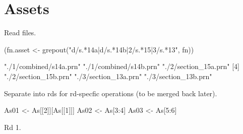 \section{Assets}


Read files.
\begin{Schunk}
\begin{Sinput}
(fn.asset <- grepout("d/s.*14a|d/s.*14b|2/s.*15|3/s.*13", fn))
\end{Sinput}
\begin{Soutput}
[1] "./1/combined/s14a.prn" "./1/combined/s14b.prn" "./2/section_15a.prn"  
[4] "./2/section_15b.prn"   "./3/section_13a.prn"   "./3/section_13b.prn"  
\end{Soutput}
\end{Schunk}
Separate into rds for rd-specfic operations (to be merged back later).
\begin{Schunk}
\begin{Sinput}
As01 <- As[[2]][As[[1]]]
As02 <- As[3:4]
As03 <- As[5:6]
\end{Sinput}
\end{Schunk}
Rd 1.
